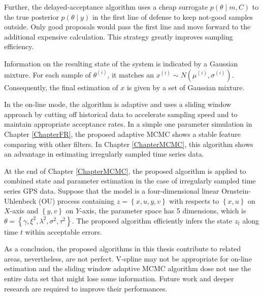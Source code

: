 Further, the delayed-acceptance algorithm uses a cheap surrogate $p(\theta\mid m, C)$ to the true posterior $p(\theta\mid y)$ in the first line of defense to keep not-good samples outside. Only good proposals would pass the first line and move forward to the additional expensive calculation. This strategy greatly improves sampling efficiency. 

Information on the resulting state of the system is indicated by a Gaussian mixture. For each sample of $\theta^{(i)}$, it matches an $x^{(i)} \sim N\left(\mu^{(i)},\sigma^{(i)}\right)$. Consequently, the final estimation of $x$ is given by a set of Gaussian mixture. 

In the on-line mode, the algorithm is adaptive and uses a sliding window approach by cutting off historical data to accelerate sampling speed and to maintain appropriate acceptance rates. In a simple one parameter simulation in Chapter \ref{ChapterFR}, the proposed adaptive MCMC shows a stable feature comparing with other filters. In Chapter \ref{ChapterMCMC}, this algorithm shows an advantage in estimating irregularly sampled time series data. 

At the end of Chapter \ref{ChapterMCMC}, the proposed algorithm is applied to combined state and parameter estimation in the case of irregularly sampled time series GPS data. Suppose that the model is a four-dimensional linear Ornstein-Uhlenbeck (OU) process containing $z=\left\lbrace x,u,y,v\right\rbrace$ with respects to $\left\lbrace x,u\right\rbrace$ on $X$-axis and $\left\lbrace y,v\right\rbrace$ on $Y$-axis, the parameter space has 5 dimensions, which is  $\theta=\left\lbrace\gamma,\xi^2,\lambda^2,\sigma^2,\tau^2\right\rbrace$. The proposed algorithm efficiently infers the state $z_t$ along time $t$ within acceptable errors. 

As a conclusion, the proposed algorithms in this thesis contribute to related areas, nevertheless, are not perfect. V-spline may not be appropriate for on-line estimation and the sliding window adaptive MCMC algorithm dose not use the entire data set that might lose some information. Future work and deeper research are required to improve their performances. 
